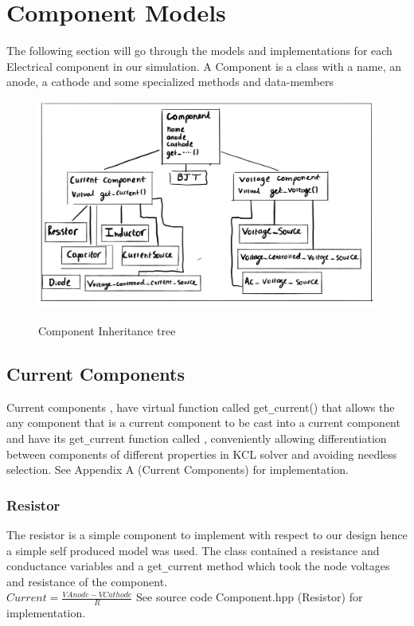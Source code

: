\documentclass{article}
\begin{document}
\section{Component Models}
The following section will go through the models and implementations for each Electrical component in our simulation.
A Component is a class with a name, an anode, a cathode and some specialized methods and data-members
\begin{figure}[h]
    \caption{Component Inheritance tree}
    \centering
    \includegraphics[width=12cm]{images/Comphpp1.jpg}
    \label{fig:Comp}
\end{figure}

\subsection{Current Components}
Current components , have virtual function called get\verb|_|current() that allows the any component that is a current component to be cast into a current component and have its get\verb|_|current function called , conveniently allowing differentiation between components of different properties in KCL solver and avoiding needless selection.
\bigbreak
See Appendix A (Current Components) for implementation.
\medbreak


\subsubsection{Resistor}
The resistor is a simple component to implement with respect to our design hence a simple self produced model was used. The class contained a resistance and conductance variables and a get\verb|_|current method which took the node voltages and resistance of the component. \bigbreak\\$Current = \frac{VAnode - VCathode}{R}$
\bigbreak
See source code Component.hpp (Resistor) for implementation.
\newpage
\end{document}
